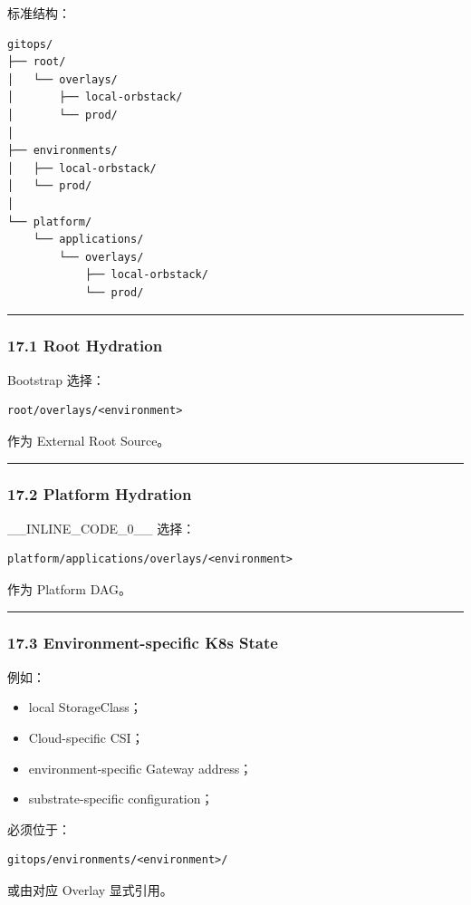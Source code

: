 \documentclass[11pt,a4paper]{article}
\begin{document}
标准结构：

\begin{lstlisting}[language=text]
gitops/
├── root/
│   └── overlays/
│       ├── local-orbstack/
│       └── prod/
│
├── environments/
│   ├── local-orbstack/
│   └── prod/
│
└── platform/
    └── applications/
        └── overlays/
            ├── local-orbstack/
            └── prod/
\end{lstlisting}
\vspace{0.5em}\hrule\vspace{0.5em}
\subsubsection{17.1 Root Hydration}
Bootstrap 选择：

\begin{lstlisting}[language=text]
root/overlays/<environment>
\end{lstlisting}
作为 External Root Source。

\vspace{0.5em}\hrule\vspace{0.5em}
\subsubsection{17.2 Platform Hydration}
\_\_INLINE\_CODE\_0\_\_ 选择：

\begin{lstlisting}[language=text]
platform/applications/overlays/<environment>
\end{lstlisting}
作为 Platform DAG。

\vspace{0.5em}\hrule\vspace{0.5em}
\subsubsection{17.3 Environment-specific K8s State}
例如：

\begin{itemize}
  \item local StorageClass；
  \item Cloud-specific CSI；
  \item environment-specific Gateway address；
  \item substrate-specific configuration；
\end{itemize}
必须位于：

\begin{lstlisting}[language=text]
gitops/environments/<environment>/
\end{lstlisting}
或由对应 Overlay 显式引用。
\end{document}
